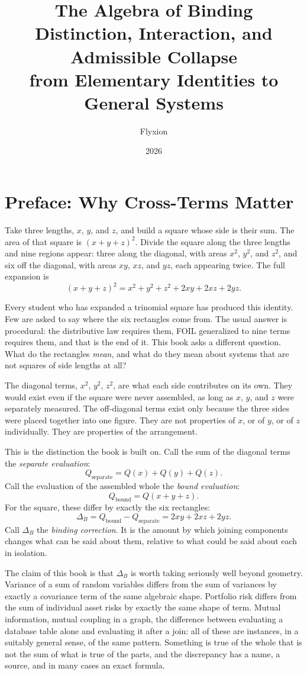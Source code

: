 \documentclass[11pt]{book}
\title{The Algebra of Binding\\[0.3em]\large Distinction, Interaction, and Admissible Collapse\\ from Elementary Identities to General Systems}
\author{Flyxion}
\date{2026}
\begin{document}
\frontmatter

\maketitle

\chapter*{Preface: Why Cross-Terms Matter}

Take three lengths, $x$, $y$, and $z$, and build a square whose side is their sum. The area of that square is $(x+y+z)^2$. Divide the square along the three lengths and nine regions appear: three along the diagonal, with areas $x^2$, $y^2$, and $z^2$, and six off the diagonal, with areas $xy$, $xz$, and $yz$, each appearing twice. The full expansion is
\[
(x+y+z)^2 = x^2+y^2+z^2+2xy+2xz+2yz.
\]

Every student who has expanded a trinomial square has produced this identity. Few are asked to say where the six rectangles come from. The usual answer is procedural: the distributive law requires them, FOIL generalized to nine terms requires them, and that is the end of it. This book asks a different question. What do the rectangles \emph{mean}, and what do they mean about systems that are not squares of side lengths at all?

The diagonal terms, $x^2$, $y^2$, $z^2$, are what each side contributes on its own. They would exist even if the square were never assembled, as long as $x$, $y$, and $z$ were separately measured. The off-diagonal terms exist only because the three sides were placed together into one figure. They are not properties of $x$, or of $y$, or of $z$ individually. They are properties of the arrangement.

This is the distinction the book is built on. Call the sum of the diagonal terms the \emph{separate evaluation}:
\[
Q_{\text{separate}} = Q(x) + Q(y) + Q(z).
\]
Call the evaluation of the assembled whole the \emph{bound evaluation}:
\[
Q_{\text{bound}} = Q(x+y+z).
\]
For the square, these differ by exactly the six rectangles:
\[
\Delta_B = Q_{\text{bound}} - Q_{\text{separate}} = 2xy+2xz+2yz.
\]
Call $\Delta_B$ the \emph{binding correction}. It is the amount by which joining components changes what can be said about them, relative to what could be said about each in isolation.

The claim of this book is that $\Delta_B$ is worth taking seriously well beyond geometry. Variance of a sum of random variables differs from the sum of variances by exactly a covariance term of the same algebraic shape. Portfolio risk differs from the sum of individual asset risks by exactly the same shape of term. Mutual information, mutual coupling in a graph, the difference between evaluating a database table alone and evaluating it after a join: all of these are instances, in a suitably general sense, of the same pattern. Something is true of the whole that is not the sum of what is true of the parts, and the discrepancy has a name, a source, and in many cases an exact formula.
\end{document}
